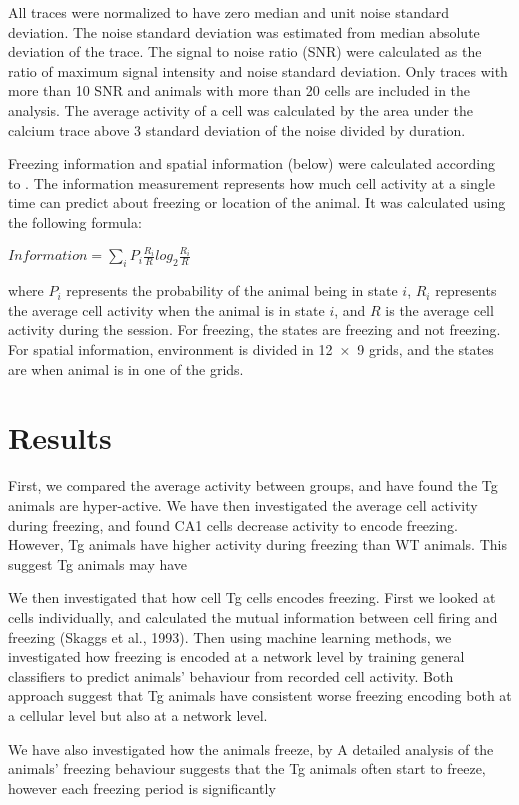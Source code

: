 All traces were normalized to have zero median and unit noise standard deviation. The noise standard deviation was estimated from median absolute deviation of the trace. The signal to noise ratio (SNR) were calculated as the ratio of maximum signal intensity and noise standard deviation. Only traces with more than 10 SNR and animals with more than 20 cells are included in the analysis. The average activity of a cell was calculated by the area under the calcium trace above 3 standard deviation of the noise divided by duration.

Freezing information and spatial information (below) were calculated according to \citet{skaggs93}. The information measurement represents how much cell activity at a single time can predict about freezing or location of the animal.  It was calculated using the following formula:

$Information = \displaystyle\sum_{i}^{}P_i  \frac{R_i}{R} log_2 \frac{R_i}{R}$

where $P_i$ represents the probability of the animal being in state $i$,  $R_i$ represents the average cell activity when the animal is in state $i$, and $R$ is the average cell activity during the session. For freezing, the states are freezing and not freezing. For spatial information, environment is divided in \num{12 x 9} grids, and the states are when animal is in one of the grids.

\section{Results}
First, we compared the average activity between groups, and have found the Tg animals are hyper-active. We have then investigated the average cell activity during freezing, and found CA1 cells decrease activity to encode freezing. However, Tg animals have higher activity during freezing than WT animals. This suggest Tg animals may have 

We then investigated that how cell Tg cells encodes freezing. First we looked at cells individually, and calculated the mutual information between cell firing and freezing (Skaggs et al., 1993). Then using machine learning methods, we investigated how freezing is encoded at a network level by training general classifiers to predict animals' behaviour from recorded cell activity. Both approach suggest that Tg animals have consistent worse freezing encoding both at a cellular level but also at a network level. 

We have also investigated how the animals freeze, by A detailed analysis of the animals' freezing behaviour suggests that the Tg animals often start to freeze, however each freezing period is significantly 
